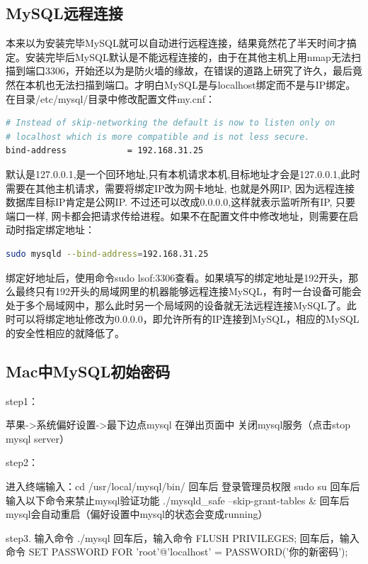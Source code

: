 \documentclass[letter]{book}
\begin{document}
\subsection{MySQL远程连接}

本来以为安装完毕MySQL就可以自动进行远程连接，结果竟然花了半天时间才搞定。安装完毕后MySQL默认是不能远程连接的，由于在其他主机上用nmap无法扫描到端口3306，开始还以为是防火墙的缘故，在错误的道路上研究了许久，最后竟然在本机也无法扫描到端口。才明白MySQL是与localhost绑定而不是与IP绑定。在目录/etc/mysql/目录中修改配置文件my.cnf：

\begin{lstlisting}[language=Bash]
# Instead of skip-networking the default is now to listen only on
# localhost which is more compatible and is not less secure.
bind-address            = 192.168.31.25
\end{lstlisting}

默认是127.0.0.1,是一个回环地址,只有本机请求本机,目标地址才会是127.0.0.1,此时需要在其他主机请求，需要将绑定IP改为网卡地址, 也就是外网IP, 因为远程连接数据库目标IP肯定是公网IP. 不过还可以改成0.0.0.0,这样就表示监听所有IP, 只要端口一样, 网卡都会把请求传给进程。如果不在配置文件中修改地址，则需要在启动时指定绑定地址：

\begin{lstlisting}[language=Bash]
sudo mysqld --bind-address=192.168.31.25
\end{lstlisting}

绑定好地址后，使用命令sudo lsof:3306查看。如果填写的绑定地址是192开头，那么最终只有192开头的局域网里的机器能够远程连接MySQL，有时一台设备可能会处于多个局域网中，那么此时另一个局域网的设备就无法远程连接MySQL了。此时可以将绑定地址修改为0.0.0.0，即允许所有的IP连接到MySQL，相应的MySQL的安全性相应的就降低了。

\subsection{Mac中MySQL初始密码}

step1：

苹果->系统偏好设置->最下边点mysql 在弹出页面中 关闭mysql服务（点击stop mysql server）

step2：

进入终端输入：cd /usr/local/mysql/bin/
回车后 登录管理员权限 sudo su
回车后输入以下命令来禁止mysql验证功能 ./mysqld\_safe --skip-grant-tables \&
回车后mysql会自动重启（偏好设置中mysql的状态会变成running）

step3. 
输入命令 ./mysql
回车后，输入命令 FLUSH PRIVILEGES; 
回车后，输入命令 SET PASSWORD FOR 'root'@'localhost' = PASSWORD('你的新密码');
\end{document}
